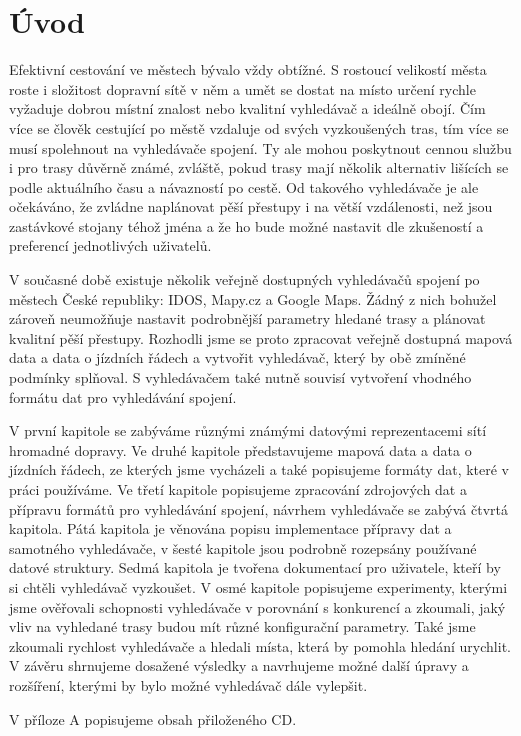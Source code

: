 \chapter*{Úvod}

Efektivní cestování ve městech bývalo vždy obtížné. S rostoucí velikostí města
roste i složitost dopravní sítě v něm a umět se dostat na místo určení rychle
vyžaduje dobrou místní znalost nebo kvalitní vyhledávač a ideálně obojí. Čím
více se člověk cestující po městě vzdaluje od svých vyzkoušených tras, tím více
se musí spolehnout na vyhledávače spojení. Ty ale mohou poskytnout cennou službu
i pro trasy důvěrně známé, zvláště, pokud trasy mají několik alternativ lišících
se podle aktuálního času a návazností po cestě. Od takového vyhledávače je ale
očekáváno, že zvládne naplánovat pěší přestupy i na větší vzdálenosti, než jsou
zastávkové stojany téhož jména a že ho bude možné nastavit dle zkušeností a
preferencí jednotlivých uživatelů. 

V současné době existuje několik veřejně dostupných vyhledávačů spojení po
městech České republiky: IDOS, Mapy.cz a Google Maps. Žádný z nich bohužel
zároveň neumožňuje nastavit podrobnější parametry hledané trasy a plánovat
kvalitní pěší přestupy. Rozhodli jsme se proto zpracovat veřejně dostupná mapová
data a data o jízdních řádech a vytvořit vyhledávač, který by obě zmíněné
podmínky splňoval. S vyhledávačem také nutně souvisí vytvoření vhodného formátu
dat pro vyhledávání spojení.

V první kapitole se zabýváme různými známými datovými reprezentacemi sítí hromadné
dopravy. Ve druhé kapitole představujeme mapová data a data o jízdních řádech,
ze kterých jsme vycházeli a také popisujeme formáty dat, které v práci
používáme. Ve třetí kapitole popisujeme zpracování zdrojových dat a přípravu
formátů pro vyhledávání spojení, návrhem vyhledávače se zabývá čtvrtá kapitola.
Pátá kapitola je věnována popisu implementace přípravy dat a samotného
vyhledávače, v šesté kapitole jsou podrobně rozepsány používané datové
struktury. Sedmá kapitola je tvořena dokumentací pro uživatele, kteří by si
chtěli vyhledávač vyzkoušet. V osmé kapitole popisujeme experimenty, kterými
jsme ověřovali schopnosti vyhledávače v porovnání s konkurencí a zkoumali, jaký
vliv na vyhledané trasy budou mít různé konfigurační parametry. Také jsme
zkoumali rychlost vyhledávače a hledali místa, která by pomohla hledání
urychlit. V závěru shrnujeme dosažené výsledky a navrhujeme možné další úpravy
a rozšíření, kterými by bylo možné vyhledávač dále vylepšit.

V příloze A popisujeme obsah přiloženého CD.
